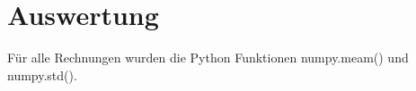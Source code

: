 \section{Auswertung}
\label{sec:Auswertung}


Für alle Rechnungen wurden die Python Funktionen numpy.meam() und numpy.std().



